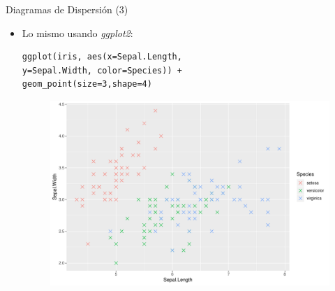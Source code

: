 \documentclass[handout]{beamer}
\begin{document}
\begin{frame}[fragile]{Diagramas de Dispersión (3)}
\scriptsize{
\begin{itemize}
 \item Lo mismo usando \emph{ggplot2}:
 \begin{verbatim}
ggplot(iris, aes(x=Sepal.Length,
y=Sepal.Width, color=Species)) + 
geom_point(size=3,shape=4)
 \end{verbatim}

  \begin{figure}[h!]
	\centering
	\includegraphics[scale=0.4]{pics/scatterggplot2.pdf}		
\end{figure} 
 
 
\end{itemize}




}
\end{frame}
\end{document}
